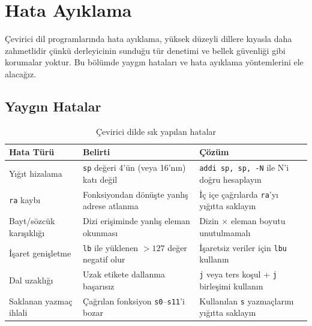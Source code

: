 \section{Hata Ayıklama}
\label{sec:hata-ayiklama}

Çevirici dil programlarında hata ayıklama, yüksek düzeyli dillere kıyasla daha zahmetlidir çünkü derleyicinin sunduğu tür denetimi ve bellek güvenliği gibi korumalar yoktur. Bu bölümde yaygın hataları ve hata ayıklama yöntemlerini ele alacağız.

\subsection{Yaygın Hatalar}
\label{subsec:yaygın-hatalar}

\begin{table}[H]
\centering
\caption[Çevirici dilde sık yapılan hatalar]{Çevirici dilde sık yapılan hatalar}
\label{tab:yaygın-hatalar}
\small
\begin{tabularx}{\textwidth}{l X X}
\toprule
\textbf{Hata Türü} & \textbf{Belirti} & \textbf{Çözüm} \\
\midrule
Yığıt hizalama & \texttt{sp} değeri 4'ün (veya 16'nın) katı değil & \texttt{addi sp, sp, -N} ile N'i doğru hesaplayın \\
\texttt{ra} kaybı & Fonksiyondan dönüşte yanlış adrese atlanma & İç içe çağrılarda \texttt{ra}'yı yığıtta saklayın \\
Bayt/sözcük karışıklığı & Dizi erişiminde yanlış eleman okunması & Dizin $\times$ eleman boyutu unutulmamalı \\
İşaret genişletme & \texttt{lb} ile yüklenen $> 127$ değer negatif olur & İşaretsiz veriler için \texttt{lbu} kullanın \\
Dal uzaklığı & Uzak etikete dallanma başarısız & \texttt{j} veya ters koşul + \texttt{j} birleşimi kullanın \\
Saklanan yazmaç ihlali & Çağrılan fonksiyon \texttt{s0}--\texttt{s11}'i bozar & Kullanılan \texttt{s} yazmaçlarını yığıtta saklayın \\
\bottomrule
\end{tabularx}
\end{table}

